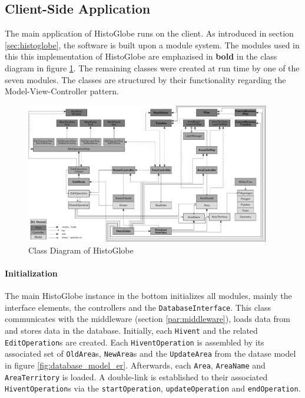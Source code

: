 

\subsection{Client-Side Application} %
\label{sub:client_side_application}

The main application of HistoGlobe runs on the client. As introduced in section \ref{sec:histoglobe}, the software is built upon a module system. The modules used in this this implementation of HistoGlobe are emphazised in \textbf{bold} in the class diagram in figure \ref{fig:class_diagram}. The remaining classes were created at run time by one of the seven modules. The classes are structured by their functionality regarding the Model-View-Controller pattern.

\begin{figure}
  \centering
  \includegraphics[width=0.95\textwidth]{graphics/development/application/class_diagram}
  \vspace{1em}
  \caption{Class Diagram of HistoGlobe}
  \label{fig:class_diagram}
\end{figure}

\newpage %
\paragraph{Initialization} %
\label{par:initialization}

The main HistoGlobe instance in the bottom initializes all modules, mainly the interface elements, the controllers and the \texttt{DatabaseInterface}. This class communicates with the middleware (section \ref{par:middleware}), loads data from and stores data in the database. Initially, each \texttt{Hivent} and the related \texttt{EditOperation}s are created. Each \texttt{HiventOperation} is assembled by its associated set of \texttt{OldArea}s, \texttt{NewArea}s and the \texttt{UpdateArea} from the datase model in  figure \ref{fig:database_model_er}. Afterwards, each \texttt{Area}, \texttt{AreaName} and \texttt{AreaTerritory} is loaded. A double-link is established to their associated \texttt{HiventOperation}s via the \texttt{startOperation}, \texttt{updateOperation} and \texttt{endOperation}.

